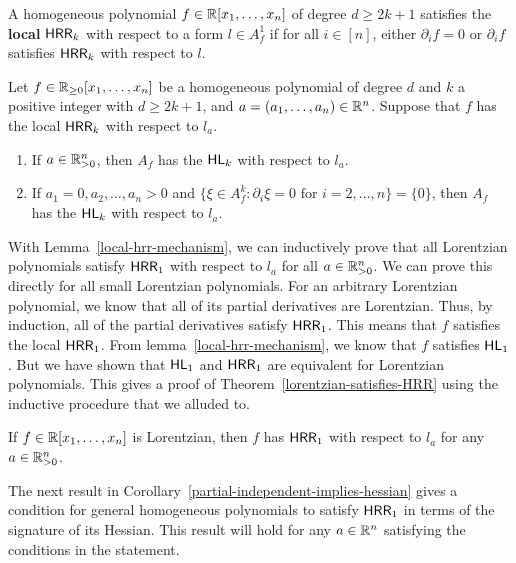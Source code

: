 \documentclass{puthesis-UG}
\begin{document}
\begin{defn}
	A homogeneous polynomial $f \in \mathbb{R}[x_1, \ldots, x_n]$ of degree $d \geq 2k+1$ satisfies the \textbf{local} $\mathsf{HRR}_k$ with respect to a form $l \in A_f^1$ if for all $i \in [n]$, either $\partial_i f = 0$ or $\partial_i f$ satisfies $\mathsf{HRR}_k$ with respect to $l$. 
\end{defn}

\begin{lem}  \label{local-hrr-mechanism}
	Let $f \in \mathbb{R}_{\geq 0}[x_1, \ldots, x_n]$ be a homogeneous polynomial of degree $d$ and $k$ a positive integer with $d \geq 2k+1$, and $a = (a_1, \ldots, a_n) \in \mathbb{R}^n$. Suppose that $f$ has the local $\mathsf{HRR}_k$ with respect to $l_a$. 
	\begin{enumerate}[label = (\roman*)]
		\item If $a \in \mathbb{R}_{> 0}^n$, then $A_f$ has the $\mathsf{HL}_k$ with respect to $l_a$. 
		\item If $a_1 = 0, a_2, \ldots, a_n > 0$ and $\{\xi \in A_f^k : \partial_i \xi = 0 \text{ for $i = 2, \ldots, n$}\} = \{0\}$, then $A_f$ has the $\mathsf{HL}_k$ with respect to $l_a$. 
	\end{enumerate}
\end{lem}

With Lemma~\ref{local-hrr-mechanism}, we can inductively prove that all Lorentzian polynomials satisfy $\mathsf{HRR}_1$ with respect to $l_a$ for all $a \in \mathbb{R}_{> 0}^n$. We can prove this directly for all small Lorentzian polynomials. For an arbitrary Lorentzian polynomial, we know that all of its partial derivatives are Lorentzian. Thus, by induction, all of the partial derivatives satisfy $\mathsf{HRR}_1$. This means that $f$ satisfies the local $\mathsf{HRR}_1$. From lemma~\ref{local-hrr-mechanism}, we know that $f$ satisfies $\mathsf{HL}_1$. But we have shown that $\mathsf{HL}_1$ and $\mathsf{HRR}_1$ are equivalent for Lorentzian polynomials. This gives a proof of Theorem~\ref{lorentzian-satisfies-HRR} using the inductive procedure that we alluded to. 

\begin{thm}  \label{lorentzian-satisfies-HRR}
	If $f \in \mathbb{R}[x_1, \ldots, x_n]$ is Lorentzian, then $f$ has $\mathsf{HRR}_1$ with respect to $l_a$ for any $a \in \mathbb{R}_{> 0}^n$. 
\end{thm}

The next result in Corollary~\ref{partial-independent-implies-hessian} gives a condition for general homogeneous polynomials to satisfy $\mathsf{HRR}_1$ in terms of the signature of its Hessian. This result will hold for any $a \in \mathbb{R}^n$ satisfying the conditions in the statement.
\end{document}
